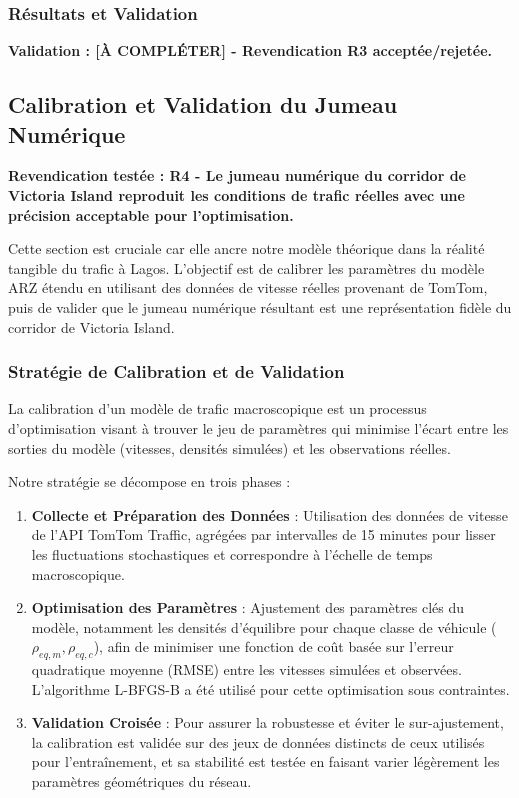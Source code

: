 \subsubsection{Résultats et Validation}
\label{subsec:resultats_numerique}

\textbf{Validation : [À COMPLÉTER] - Revendication R3 acceptée/rejetée.}

\subsection{Calibration et Validation du Jumeau Numérique}
\label{sec:validation_jumeau_numerique}

\textbf{Revendication testée : R4 - Le jumeau numérique du corridor de Victoria Island reproduit les conditions de trafic réelles avec une précision acceptable pour l'optimisation.}

Cette section est cruciale car elle ancre notre modèle théorique dans la réalité tangible du trafic à Lagos. L'objectif est de calibrer les paramètres du modèle ARZ étendu en utilisant des données de vitesse réelles provenant de TomTom, puis de valider que le jumeau numérique résultant est une représentation fidèle du corridor de Victoria Island.

\subsubsection{Stratégie de Calibration et de Validation}
\label{subsec:strategie_calibration}

La calibration d'un modèle de trafic macroscopique est un processus d'optimisation visant à trouver le jeu de paramètres qui minimise l'écart entre les sorties du modèle (vitesses, densités simulées) et les observations réelles.

Notre stratégie se décompose en trois phases :
\begin{enumerate}
    \item \textbf{Collecte et Préparation des Données} : Utilisation des données de vitesse de l'API TomTom Traffic, agrégées par intervalles de 15 minutes pour lisser les fluctuations stochastiques et correspondre à l'échelle de temps macroscopique.
    \item \textbf{Optimisation des Paramètres} : Ajustement des paramètres clés du modèle, notamment les densités d'équilibre pour chaque classe de véhicule ($\rho_{eq,m}, \rho_{eq,c}$), afin de minimiser une fonction de coût basée sur l'erreur quadratique moyenne (RMSE) entre les vitesses simulées et observées. L'algorithme L-BFGS-B a été utilisé pour cette optimisation sous contraintes.
    \item \textbf{Validation Croisée} : Pour assurer la robustesse et éviter le sur-ajustement, la calibration est validée sur des jeux de données distincts de ceux utilisés pour l'entraînement, et sa stabilité est testée en faisant varier légèrement les paramètres géométriques du réseau.
\end{enumerate}

